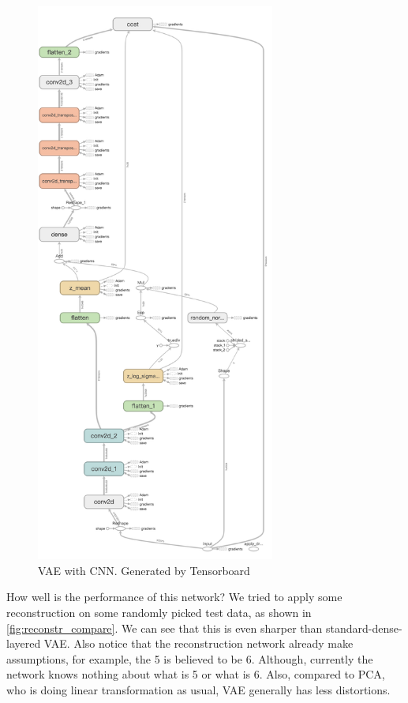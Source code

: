 \documentclass[a4paper,10pt,UTF8]{article}
\numberwithin{equation}{section}
\numberwithin{figure}{section}
\begin{document}
\begin{figure}[htbp]
\centering
\includegraphics[width=0.7\textwidth]{img/convnet_structure.png}
\caption{VAE with CNN. Generated by Tensorboard}
\label{fig:convnet_structure}
\end{figure}

How well is the performance of this network? We tried to apply some reconstruction on some randomly picked test data, as shown in \autoref{fig:reconstr_compare}. We can see that this is even sharper than standard-dense-layered VAE. Also notice that the reconstruction network already make assumptions, for example, the 5 is believed to be 6. Although, currently the network knows nothing about what is 5 or what is 6. Also, compared to PCA, who is doing linear transformation as usual, VAE generally has less distortions.
\end{document}
